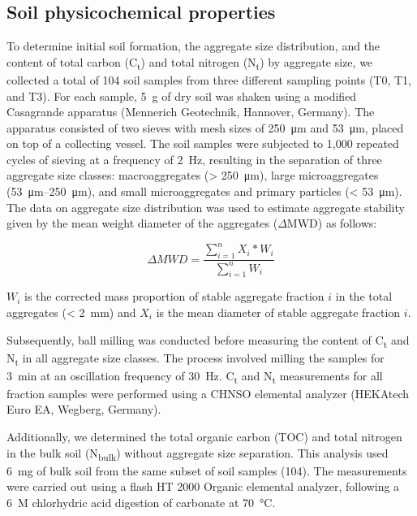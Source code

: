 \subsection{Soil physicochemical properties}

To determine initial soil formation, the aggregate size distribution, and the content of total carbon (C\textsubscript{t}) and total nitrogen (N\textsubscript{t}) by aggregate size, we collected a total of 104 soil samples from three different sampling points (T0, T1, and T3). For each sample, \SI{5}{\gram} of dry soil was shaken using a modified Casagrande apparatus (Mennerich Geotechnik, Hannover, Germany). The apparatus consisted of two sieves with mesh sizes of \SI{250}{\micro\metre} and \SI{53}{\micro\metre}, placed on top of a collecting vessel. The soil samples were subjected to 1,000 repeated cycles of sieving at a frequency of \SI{2}{\hertz}, resulting in the separation of three aggregate size classes: macroaggregates (\SI{> 250}{\micro\metre}), large microaggregates (\SIrange{53}{250}{\micro\metre}), and small microaggregates and primary particles (\SI{< 53}{\micro\metre}). The data on aggregate size distribution was used to estimate aggregate stability given by the mean weight diameter of the aggregates ($\Delta$MWD) as follows:

    $$\Delta MWD = \frac{\sum_{i=1}^{n} X_i*W_i}{\sum_{i=1}^{n} W_i}$$

\(W_i\) is the corrected mass proportion of stable aggregate fraction \(i\) in the total aggregates (\SI{< 2}{\milli\metre}) and \(X_i\) is the mean diameter of stable aggregate fraction \(i\).

Subsequently, ball milling was conducted before measuring the content of C\textsubscript{t} and N\textsubscript{t} in all aggregate size classes. The process involved milling the samples for \SI{3}{\minute} at an oscillation frequency of \SI{30}{\hertz}. C\textsubscript{t} and N\textsubscript{t} measurements for all fraction samples were performed using a CHNSO elemental analyzer (HEKAtech Euro EA, Wegberg, Germany).

Additionally, we determined the total organic carbon (TOC) and total nitrogen in the bulk soil (N\textsubscript{bulk}) without aggregate size separation. This analysis used \SI{6}{\milli\gram} of bulk soil from the same subset of soil samples (104). The measurements were carried out using a flash HT 2000 Organic elemental analyzer, following a \SI{6}{M} chlorhydric acid digestion of carbonate at \SI{70}{\degreeCelsius}.


